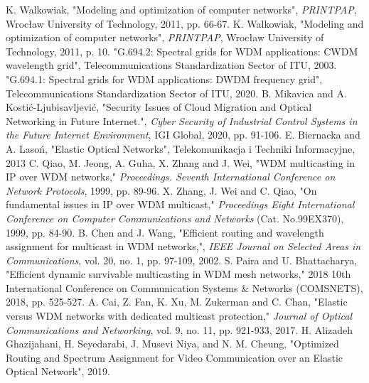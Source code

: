 \documentclass[conference]{IEEEtran}
\begin{document}
\begin{thebibliography}{00}
 K. Walkowiak, "Modeling and optimization of computer networks", \textit{PRINTPAP}, Wrocław University of Technology, 2011, pp. 66-67.
 K. Walkowiak, "Modeling and optimization of computer networks", \textit{PRINTPAP}, Wrocław University of Technology, 2011, p. 10.
 "G.694.2: Spectral grids for WDM applications: CWDM wavelength grid", Telecommunications Standardization Sector of ITU, 2003.
 "G.694.1: Spectral grids for WDM applications: DWDM frequency grid", Telecommunications Standardization Sector of ITU, 2020.
 B. Mikavica and A. Kostić-Ljubisavljević, "Security Issues of Cloud Migration and Optical Networking in Future Internet.", \textit{Cyber Security of Industrial Control Systems in the Future Internet Environment}, IGI Global, 2020, pp. 91-106.
 E. Biernacka and A. Lasoń, "Elastic Optical Networks", Telekomunikacja i Techniki Informacyjne, 2013
 C. Qiao, M. Jeong, A. Guha, X. Zhang and J. Wei, "WDM multicasting in IP over WDM networks," \textit{Proceedings. Seventh International Conference on Network Protocols}, 1999, pp. 89-96.
 X. Zhang, J. Wei and C. Qiao, "On fundamental issues in IP over WDM multicast," \textit{Proceedings Eight International Conference on Computer Communications and Networks} (Cat. No.99EX370), 1999, pp. 84-90.
 B. Chen and J. Wang, "Efficient routing and wavelength assignment for multicast in WDM networks,", \textit{IEEE Journal on Selected Areas in Communications}, vol. 20, no. 1, pp. 97-109, 2002.
 S. Paira and U. Bhattacharya, "Efficient dynamic survivable multicasting in WDM mesh networks," 2018 10th International Conference on Communication Systems \& Networks (COMSNETS), 2018, pp. 525-527.
 A. Cai, Z. Fan, K. Xu, M. Zukerman and C. Chan, "Elastic versus WDM networks with dedicated multicast protection," \textit{Journal of Optical Communications and Networking}, vol. 9, no. 11, pp. 921-933, 2017.
 H. Alizadeh Ghazijahani, H. Seyedarabi, J. Musevi Niya, and N. M. Cheung, "Optimized Routing and Spectrum Assignment for Video Communication over an Elastic Optical Network", 2019.
\end{thebibliography}
\end{document}
